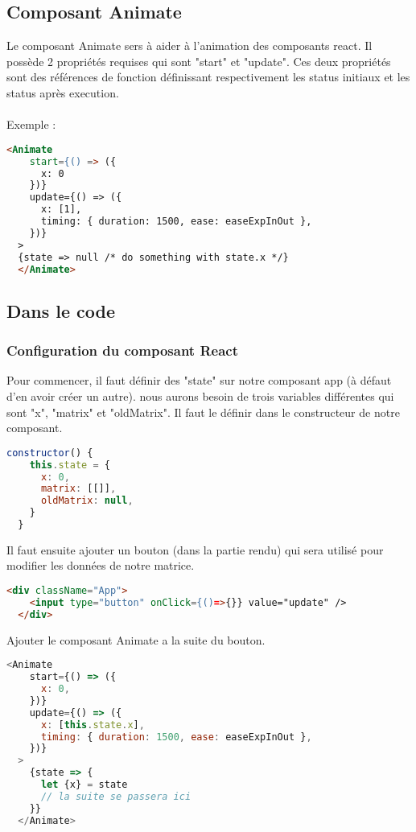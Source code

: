\documentclass[a4paper, french, 12pt]{extarticle}
\begin{document}
\subsection{Composant Animate}
Le composant Animate sers à aider à l'animation des composants react. Il possède 2 propriétés requises qui sont "start" et "update". Ces deux propriétés sont des références de fonction définissant respectivement les status initiaux et les status après execution.\\\\
Exemple :
\begin{lstlisting}[language=html]
  <Animate
    start={() => ({
      x: 0
    })}
    update={() => ({
      x: [1],
      timing: { duration: 1500, ease: easeExpInOut },
    })}
  >
  {state => null /* do something with state.x */}
  </Animate>
\end{lstlisting}

\subsection{Dans le code}
\subsubsection{Configuration du composant React}
Pour commencer, il faut définir des "state" sur notre composant app (à défaut d'en avoir créer un autre). nous aurons besoin de trois variables différentes qui sont "x", "matrix" et "oldMatrix". Il faut le définir dans le constructeur de notre composant.
\begin{lstlisting}[language=JavaScript]
  constructor() {
    this.state = {
      x: 0,
      matrix: [[]],
      oldMatrix: null,
    }
  }
\end{lstlisting}
Il faut ensuite ajouter un bouton (dans la partie rendu) qui sera utilisé pour modifier les données de notre matrice.
\begin{lstlisting}[language=html]
  <div className="App">
    <input type="button" onClick={()=>{}} value="update" />
  </div>
\end{lstlisting}
Ajouter le composant Animate a la suite du bouton.
\begin{lstlisting}[language=JavaScript]
  <Animate
    start={() => ({
      x: 0,
    })}
    update={() => ({
      x: [this.state.x],
      timing: { duration: 1500, ease: easeExpInOut },
    })}
  >
    {state => {
      let {x} = state
      // la suite se passera ici
    }}
  </Animate>
\end{lstlisting}
\pagebreak
\end{document}
